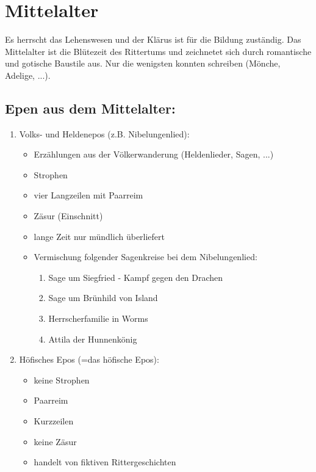 \documentclass[12pt,a4paper]{article}
\begin{document}
\newpage	
	
\section{Mittelalter}	

Es herrscht das Lehenswesen und der Klärus ist für die Bildung zuständig.
Das Mittelalter ist die Blütezeit des Rittertums und zeichnetet sich durch romantische und gotische Baustile aus.
Nur die wenigsten konnten schreiben (Mönche, Adelige, ...).	

\subsection{Epen aus dem Mittelalter:}

	\begin{enumerate}
		\item Volks- und Heldenepos (z.B. Nibelungenlied):
			\begin{itemize}
			\item Erzählungen aus der Völkerwanderung (Heldenlieder, Sagen, ...)
			\item Strophen
			\item vier Langzeilen mit Paarreim
			\item Zäsur (Einschnitt)
			\item lange Zeit nur mündlich überliefert
			\item Vermischung folgender Sagenkreise bei dem Nibelungenlied:
			
				\begin{enumerate}
				\item Sage um Siegfried - Kampf gegen den Drachen
				\item Sage um Brünhild von Island
				\item Herrscherfamilie in Worms
				\item Attila der Hunnenkönig
				\end{enumerate}
			
			\end{itemize}
			
		\item Höfisches Epos (=das höfische Epos):
			\begin{itemize}
			\item keine Strophen
			\item Paarreim
			\item Kurzzeilen
			\item keine Zäsur
			\item handelt von fiktiven Rittergeschichten
			\end{itemize}						
	

\end{enumerate}
\end{document}
